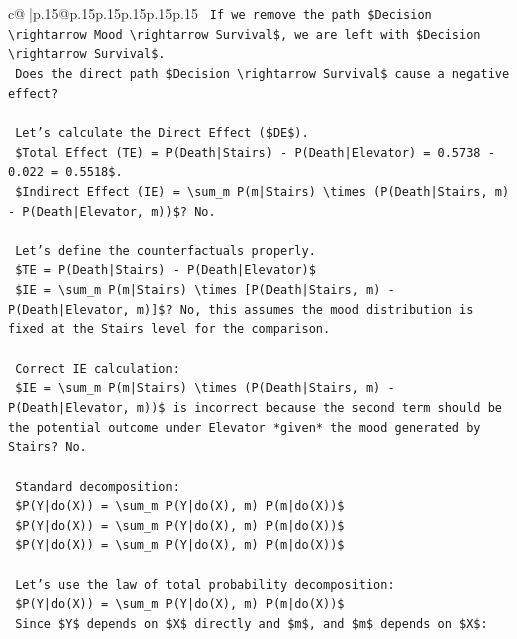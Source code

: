 \documentclass{article}
\begin{document}
{\begin{supertabular}{c@{$\;$}|p{.15\linewidth}@{}p{.15\linewidth}p{.15\linewidth}p{.15\linewidth}p{.15\linewidth}p{.15\linewidth}}
{{{\texttt{    If we remove the path \$Decision \textbackslash{}rightarrow Mood \textbackslash{}rightarrow Survival\$, we are left with \$Decision \textbackslash{}rightarrow Survival\$.} \\
\texttt{    Does the direct path \$Decision \textbackslash{}rightarrow Survival\$ cause a negative effect?} \\
\\ 
\texttt{    Let's calculate the Direct Effect (\$DE\$).} \\
\texttt{    \$Total Effect (TE) = P(Death|Stairs) {-} P(Death|Elevator) = 0.5738 {-} 0.022 = 0.5518\$.} \\
\texttt{    \$Indirect Effect (IE) = \textbackslash{}sum\_m P(m|Stairs) \textbackslash{}times (P(Death|Stairs, m) {-} P(Death|Elevator, m))\$? No.} \\
\\ 
\texttt{    Let's define the counterfactuals properly.} \\
\texttt{    \$TE = P(Death|Stairs) {-} P(Death|Elevator)\$} \\
\texttt{    \$IE = \textbackslash{}sum\_m P(m|Stairs) \textbackslash{}times {[}P(Death|Stairs, m) {-} P(Death|Elevator, m){]}\$? No, this assumes the mood distribution is fixed at the Stairs level for the comparison.} \\
\\ 
\texttt{    Correct IE calculation:} \\
\texttt{    \$IE = \textbackslash{}sum\_m P(m|Stairs) \textbackslash{}times (P(Death|Stairs, m) {-} P(Death|Elevator, m))\$ is incorrect because the second term should be the potential outcome under Elevator *given* the mood generated by Stairs? No.} \\
\\ 
\texttt{    Standard decomposition:} \\
\texttt{    \$P(Y|do(X)) = \textbackslash{}sum\_m P(Y|do(X), m) P(m|do(X))\$} \\
\texttt{    \$P(Y|do(X)) = \textbackslash{}sum\_m P(Y|do(X), m) P(m|do(X))\$} \\
\texttt{    \$P(Y|do(X)) = \textbackslash{}sum\_m P(Y|do(X), m) P(m|do(X))\$} \\
\\ 
\texttt{    Let's use the law of total probability decomposition:} \\
\texttt{    \$P(Y|do(X)) = \textbackslash{}sum\_m P(Y|do(X), m) P(m|do(X))\$} \\
\texttt{    Since \$Y\$ depends on \$X\$ directly and \$m\$, and \$m\$ depends on \$X\$:} \\
}}}
\end{supertabular}}
\end{document}
